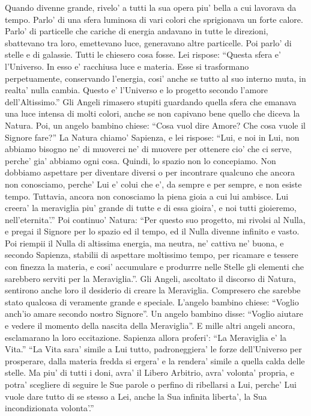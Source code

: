 {Quando divenne grande, rivelo' a tutti la sua opera piu' bella a cui lavorava da tempo. Parlo' di una sfera luminosa di vari colori che sprigionava un forte calore. Parlo' di particelle che cariche di energia andavano in tutte le direzioni, sbattevano tra loro, emettevano luce, generavano altre particelle. Poi parlo' di stelle e di galassie.
Tutti le chiesero cosa fosse.
Lei rispose: \enquote{Questa sfera e' l'Universo. In esso e' racchiusa luce e materia. Esse si trasformano perpetuamente, conservando l'energia, cosi' anche se tutto al suo interno muta, in realta' nulla cambia. Questo e' l'Universo e lo progetto secondo l'amore dell'Altissimo.}
Gli Angeli rimasero stupiti guardando quella sfera che emanava una luce intensa di molti colori, anche se non capivano bene quello che diceva la Natura.
Poi, un angelo bambino chiese: \enquote{Cosa vuol dire Amore? Che cosa vuole il Signore fare?}
La Natura chiamo' Sapienza, e lei rispose: \enquote{Lui, e noi in Lui, non abbiamo bisogno ne' di muoverci ne' di muovere per ottenere cio' che ci serve, perche' gia' abbiamo ogni cosa. Quindi, lo spazio non lo concepiamo. Non dobbiamo aspettare per diventare diversi o per incontrare qualcuno che ancora non conosciamo, perche' Lui e' colui che e', da sempre e per sempre, e non esiste tempo. Tuttavia, ancora non conosciamo la piena gioia a cui lui ambisce. Lui creera' la meraviglia piu' grande di tutte e di essa gioira', e noi tutti gioieremo, nell'eternita'.}
Poi continuo' Natura: \enquote{Per questo suo progetto, mi rivolsi al Nulla, e pregai il Signore per lo spazio ed il tempo, ed il Nulla divenne infinito e vasto. Poi riempii il Nulla di altissima energia, ma neutra, ne' cattiva ne' buona, e secondo Sapienza, stabilii di aspettare moltissimo tempo, per ricamare e tessere con finezza la materia, e cosi' accumulare e produrrre nelle Stelle gli elementi che sarebbero serviti per la Meraviglia.}.
  Gli Angeli, ascoltato il discorso di Natura, sentirono anche loro il desiderio di creare la Meraviglia. Compresero che sarebbe stato qualcosa di veramente grande e speciale.
  L'angelo bambino chiese: \enquote{Voglio anch'io amare secondo nostro Signore}. Un angelo bambino disse: \enquote{Voglio aiutare e vedere il momento della nascita della Meraviglia}. E mille altri angeli ancora, esclamarano la loro eccitazione.
  Sapienza allora proferi': \enquote{La Meraviglia e' la Vita.}
\enquote{La Vita sara' simile a Lui tutto, padroneggiera' le forze dell'Universo per prosperare, dalla materia fredda si ergera' e la rendera' simile a quella calda delle stelle. Ma piu' di tutti i doni, avra' il Libero Arbitrio, avra' volonta' propria, e potra' scegliere di seguire le Sue parole o perfino di ribellarsi a Lui, perche' Lui vuole dare tutto di se stesso a Lei, anche la Sua infinita liberta', la Sua incondizionata volonta'.}
}
